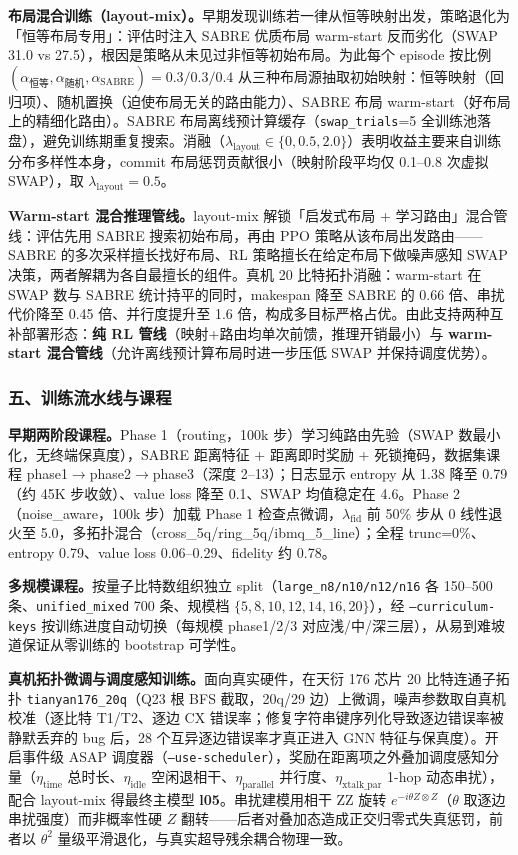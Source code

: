 \textbf{布局混合训练（layout-mix）。}早期发现训练若一律从恒等映射出发，策略退化为「恒等布局专用」：评估时注入 SABRE 优质布局 warm-start 反而劣化（SWAP 31.0 vs 27.5），根因是策略从未见过非恒等初始布局。为此每个 episode 按比例 $(\alpha_{\text{恒等}},\alpha_{\text{随机}},\alpha_{\text{SABRE}})=0.3/0.3/0.4$ 从三种布局源抽取初始映射：恒等映射（回归项）、随机置换（迫使布局无关的路由能力）、SABRE 布局 warm-start（好布局上的精细化路由）。SABRE 布局离线预计算缓存（\texttt{swap\_trials}=5 全训练池落盘），避免训练期重复搜索。消融（$\lambda_{\mathrm{layout}}\in\{0,0.5,2.0\}$）表明收益主要来自训练分布多样性本身，commit 布局惩罚贡献很小（映射阶段平均仅 0.1--0.8 次虚拟 SWAP），取 $\lambda_{\mathrm{layout}}=0.5$。

\textbf{Warm-start 混合推理管线。}layout-mix 解锁「启发式布局 + 学习路由」混合管线：评估先用 SABRE 搜索初始布局，再由 PPO 策略从该布局出发路由——SABRE 的多次采样擅长找好布局、RL 策略擅长在给定布局下做噪声感知 SWAP 决策，两者解耦为各自最擅长的组件。真机 20 比特拓扑消融：warm-start 在 SWAP 数与 SABRE 统计持平的同时，makespan 降至 SABRE 的 0.66 倍、串扰代价降至 0.45 倍、并行度提升至 1.6 倍，构成多目标严格占优。由此支持两种互补部署形态：\textbf{纯 RL 管线}（映射+路由均单次前馈，推理开销最小）与 \textbf{warm-start 混合管线}（允许离线预计算布局时进一步压低 SWAP 并保持调度优势）。

\subsubsection{五、训练流水线与课程}

\textbf{早期两阶段课程。}Phase 1（routing，100k 步）学习纯路由先验（SWAP 数最小化，无终端保真度），SABRE 距离特征 + 距离即时奖励 + 死锁掩码，数据集课程 phase1$\to$phase2$\to$phase3（深度 2--13）；日志显示 entropy 从 1.38 降至 0.79（约 45K 步收敛）、value loss 降至 0.1、SWAP 均值稳定在 4.6。Phase 2（noise\_aware，100k 步）加载 Phase 1 检查点微调，$\lambda_{\mathrm{fid}}$ 前 50\% 步从 0 线性退火至 5.0，多拓扑混合（cross\_5q/ring\_5q/ibmq\_5\_line）；全程 trunc=0\%、entropy 0.79、value loss 0.06--0.29、fidelity 约 0.78。

\textbf{多规模课程。}按量子比特数组织独立 split（\texttt{large\_n8/n10/n12/n16} 各 150--500 条、\texttt{unified\_mixed} 700 条、规模档 $\{5,8,10,12,14,16,20\}$），经 \texttt{--curriculum-keys} 按训练进度自动切换（每规模 phase1/2/3 对应浅/中/深三层），从易到难坡道保证从零训练的 bootstrap 可学性。

\textbf{真机拓扑微调与调度感知训练。}面向真实硬件，在天衍 176 芯片 20 比特连通子拓扑 \texttt{tianyan176\_20q}（Q23 根 BFS 截取，20q/29 边）上微调，噪声参数取自真机校准（逐比特 T1/T2、逐边 CX 错误率；修复字符串键序列化导致逐边错误率被静默丢弃的 bug 后，28 个互异逐边错误率才真正进入 GNN 特征与保真度）。开启事件级 ASAP 调度器（\texttt{--use-scheduler}），奖励在距离项之外叠加调度感知分量（$\eta_{\mathrm{time}}$ 总时长、$\eta_{\mathrm{idle}}$ 空闲退相干、$\eta_{\mathrm{parallel}}$ 并行度、$\eta_{\mathrm{xtalk\_par}}$ 1-hop 动态串扰），配合 layout-mix 得最终主模型 \textbf{l05}。串扰建模用相干 ZZ 旋转 $e^{-i\theta Z\otimes Z}$（$\theta$ 取逐边串扰强度）而非概率性硬 $Z$ 翻转——后者对叠加态造成正交归零式失真惩罚，前者以 $\theta^2$ 量级平滑退化，与真实超导残余耦合物理一致。

